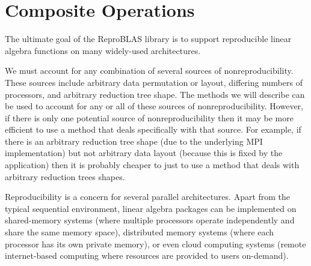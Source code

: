 \section{Composite Operations}
  \label{sec:compositeops}
  The ultimate goal of the ReproBLAS library is to support reproducible linear algebra functions on many widely-used architectures.

  We must account for any combination of several sources of
  nonreproducibility. These sources include arbitrary data
  permutation or layout, differing numbers of processors, and arbitrary
  reduction tree shape. The methods we will describe can be used to
  account for any or all of these sources of nonreproducibility. However, if there is only one potential source of nonreproducibility then it may be more efficient to use a method that deals specifically with that source. For example, if there is an arbitrary reduction tree shape (due to the underlying MPI implementation) but not arbitrary data layout (because this is fixed by the application) then it is probably cheaper to just to use a method
that deals with arbitrary reduction trees shapes.

  Reproducibility is a concern for several parallel architectures. Apart from the typical sequential environment, linear algebra packages can be implemented on shared-memory systems (where multiple processors operate independently and share the same memory space), distributed memory systems (where each processor has its own private memory), or even cloud computing systems (remote internet-based computing where resources are provided to users on-demand).

